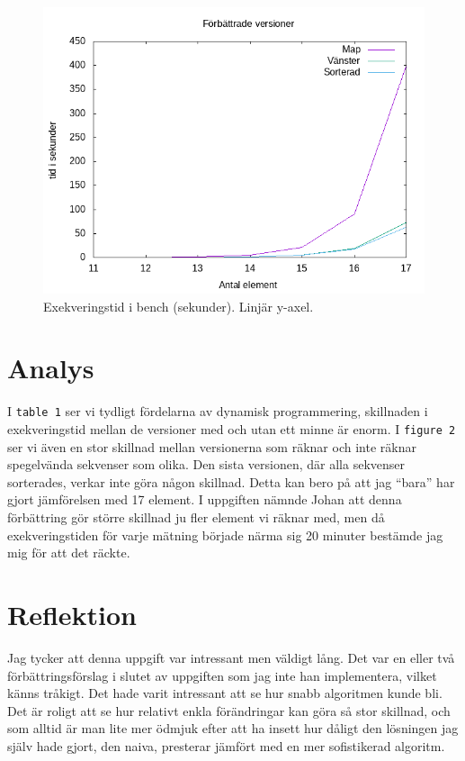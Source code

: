 \documentclass[a4paper,11pt]{article}
\begin{document}
\begin{figure}[H]
  \center
  \includegraphics[width=\linewidth]{./latex/images/bench_all_improvments_lin.png}
  \caption{Exekveringstid i bench (sekunder). Linjär y-axel.}
  \label{fig:bench_improvements_lin}
\end{figure}

\section*{Analys} 
I {\tt table 1} ser vi tydligt fördelarna av dynamisk programmering, skillnaden i exekveringstid mellan de versioner med och utan ett minne är enorm. I {\tt figure 2} ser vi även en stor skillnad mellan versionerna som räknar och inte räknar spegelvända sekvenser som olika. Den sista versionen, där alla sekvenser sorterades, verkar inte göra någon skillnad. Detta kan bero på att jag ``bara'' har gjort jämförelsen med 17 element. I uppgiften nämnde Johan att denna förbättring gör större skillnad ju fler element vi räknar med, men då exekveringstiden för varje mätning började närma sig 20 minuter bestämde jag mig för att det räckte. 

\section*{Reflektion}
Jag tycker att denna uppgift var intressant men väldigt lång. Det var en eller två förbättringsförslag i slutet av uppgiften som jag inte han implementera, vilket känns tråkigt. Det hade varit intressant att se hur snabb algoritmen kunde bli.\\
Det är roligt att se hur relativt enkla förändringar kan göra så stor skillnad, och som alltid är man lite mer ödmjuk efter att ha insett hur dåligt den lösningen jag själv hade gjort, den naiva, presterar jämfört med en mer sofistikerad algoritm.
  
\end{document}
